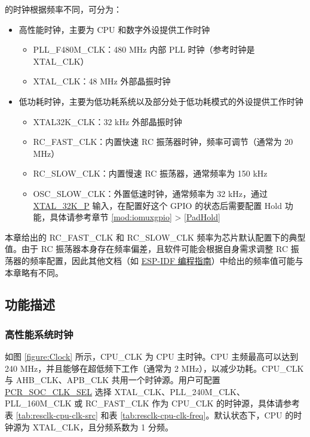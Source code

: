 \documentclass[main\_\_CN.tex]{subfiles}
\begin{document}
\chipname{} 的时钟根据频率不同，可分为：
\begin{itemize}
    \item 高性能时钟，主要为 CPU 和数字外设提供工作时钟
    \begin{itemize}
        \item PLL\_F480M\_CLK：480 MHz 内部 PLL 时钟（参考时钟是 XTAL\_CLK）
        \item XTAL\_CLK：48 MHz 外部晶振时钟
    \end{itemize}
    \item 低功耗时钟，主要为低功耗系统以及部分处于低功耗模式的外设提供工作时钟
    \begin{itemize}
        \item XTAL32K\_CLK：32 kHz 外部晶振时钟
	    \item RC\_FAST\_CLK：内置快速 RC 振荡器时钟，频率可调节（通常为 20 MHz）
	    \item RC\_SLOW\_CLK：内置慢速 RC 振荡器，通常频率为 150 kHz
	    \item OSC\_SLOW\_CLK：外置低速时钟，通常频率为 32 kHz，通过 \hyperref[tab:ANA-IO-MUX-CN]{XTAL\_32K\_P} 输入，在配置好这个 GPIO 的状态后需要配置 Hold 功能，具体请参考章节 \ref{mod:iomuxgpio} \textit{} >  \ref{PadHold} \textit{}
    \end{itemize}
\end{itemize}

\begin{tiplisting}
本章给出的 RC\_FAST\_CLK 和 RC\_SLOW\_CLK 频率为芯片默认配置下的典型值。由于 RC 振荡器本身存在频率偏差，且软件可能会根据自身需求调整 RC 振荡器的频率配置，因此其他文档（如 \href{https://docs.espressif.com/projects/esp-idf/zh_CN/latest/esp32c5/api-reference/peripherals/clk_tree.html}{ESP-IDF 编程指南}）中给出的频率值可能与本章略有不同。
\end{tiplisting}

\subsection{功能描述}

\subsubsection{高性能系统时钟}

如图 \ref{figure:Clock} 所示，CPU\_CLK 为 CPU 主时钟。CPU 主频最高可以达到 240 MHz，并且能够在超低频下工作（通常为 2 MHz），以减少功耗。CPU\_CLK 与 AHB\_CLK、APB\_CLK 共用一个时钟源。用户可配置 \hyperref[fielddesc:PCRSOCCLKSEL]{PCR\_SOC\_CLK\_SEL} 选择 XTAL\_CLK、PLL\_240M\_CLK、PLL\_160M\_CLK 或 RC\_FAST\_CLK 作为 CPU\_CLK 的时钟源，具体请参考表 \ref{tab:resclk-cpu-clk-src} 和表 \ref{tab:resclk-cpu-clk-freq}。默认状态下，CPU 的时钟源为 XTAL\_CLK，且分频系数为 1 分频。
\end{document}

